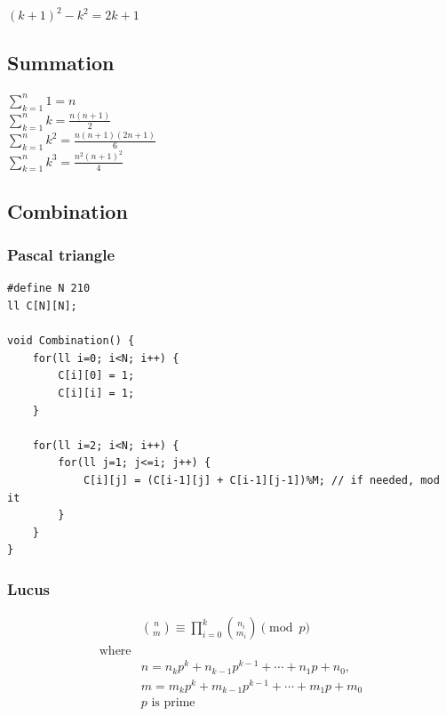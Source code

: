 \documentclass[10pt,oneside]{article}
\begin{document}
\begin{landscape}
\begin{multicols}{2}
{\normalsize 
$(k + 1)^2 - k^2 = 2k + 1$
}

\subsection{Summation}

{\normalsize 
$\sum_{k=1}^{n} 1= n$\\
$\sum_{k=1}^{n} k= \frac{n(n+1)}{2}$\\
$\sum_{k=1}^{n} k^2= \frac{n(n+1)(2n+1)}{6}$\\
$\sum_{k=1}^{n} k^3= \frac{n^2(n+1)^2}{4}$\\
}


\subsection{Combination}

\subsubsection{Pascal triangle}

\begin{verbatim}
#define N 210
ll C[N][N];

void Combination() {
    for(ll i=0; i<N; i++) {
        C[i][0] = 1;
        C[i][i] = 1;
    }
    
    for(ll i=2; i<N; i++) {
        for(ll j=1; j<=i; j++) {
            C[i][j] = (C[i-1][j] + C[i-1][j-1])%M; // if needed, mod it
        }
    }
}
\end{verbatim}

\subsubsection{Lucus}

\begin{equation}
\begin{split}&\binom{n}{m} \equiv \prod_{i=0}^k \binom{n_i}{m_i} \pmod p \\
\text{where}& \\
&n = n_kp^k+n_{k-1}p^{k-1}+\cdots +n_1p+n_0, \\
&m = m_kp^k+m_{k-1}p^{k-1}+\cdots +m_1p+m_0 \\
&p \text{ is prime}
\end{split}
\end{equation}


\end{multicols}
\end{landscape}
\end{document}
